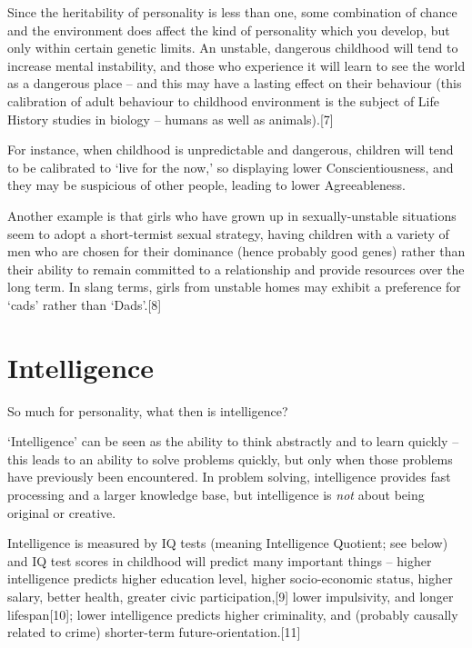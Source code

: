 \documentclass[
]{book}
\begin{document}
Since the heritability of personality is less than one, some combination of chance and the environment does affect the kind of personality which you develop, but only within certain genetic limits. An unstable, dangerous childhood will tend to increase mental instability, and those who experience it will learn to see the world as a dangerous place -- and this may have a lasting effect on their behaviour (this calibration of adult behaviour to childhood environment is the subject of Life History studies in biology -- humans as well as animals).{[}7{]}

For instance, when childhood is unpredictable and dangerous, children will tend to be calibrated to `live for the now,' so displaying lower Conscientiousness, and they may be suspicious of other people, leading to lower Agreeableness.

Another example is that girls who have grown up in sexually-unstable situations seem to adopt a short-termist sexual strategy, having children with a variety of men who are chosen for their dominance (hence probably good genes) rather than their ability to remain committed to a relationship and provide resources over the long term. In slang terms, girls from unstable homes may exhibit a preference for `cads' rather than `Dads'.{[}8{]}

\hypertarget{intelligence}{%
\section{Intelligence}\label{intelligence}}

So much for personality, what then is intelligence?

`Intelligence' can be seen as the ability to think abstractly and to learn quickly -- this leads to an ability to solve problems quickly, but only when those problems have previously been encountered. In problem solving, intelligence provides fast processing and a larger knowledge base, but intelligence is \emph{not} about being original or creative.

Intelligence is measured by IQ tests (meaning Intelligence Quotient; see below) and IQ test scores in childhood will predict many important things -- higher intelligence predicts higher education level, higher socio-economic status, higher salary, better health, greater civic participation,{[}9{]} lower impulsivity, and longer lifespan{[}10{]}; lower intelligence predicts higher criminality, and (probably causally related to crime) shorter-term future-orientation.{[}11{]}
\end{document}
